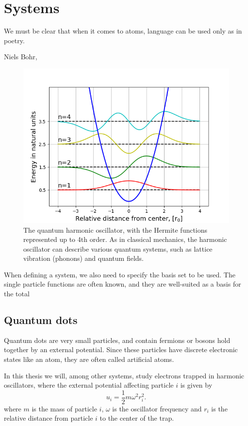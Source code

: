 \chapter{Systems} \label{chp:systems}
\epigraph{We must be clear that when it comes to atoms, language can be used only as in poetry.}{Niels Bohr, \cite{heisenberg_physics_1971}}
\begin{figure}[H]
	\centering
	\includegraphics[scale=0.9]{Images/harmonicOscillator.png}
	\caption{The quantum harmonic oscillator, with the Hermite functions represented up to 4th order. As in classical mechanics, the harmonic oscillator can describe various quantum systems, such as lattice vibration (phonons) and quantum fields.}
	\label{fig:harmonicoscillator}
\end{figure}

When defining a system, we also need to specify the basis set to be used. The single particle functions are often known, and they are well-suited as a basis for the total

\newpage
\section{Quantum dots} \label{subsubsec:quantumdots}
Quantum dots are very small particles, and contain fermions or bosons hold together by an external potential. Since these particles have discrete electronic states like an atom, they are often called artificial atoms. 

In this thesis we will, among other systems, study electrons trapped in harmonic oscillators, where the external potential affecting particle $i$ is given by
\begin{equation}
u_i=\frac{1}{2}m\omega^2r_i^2.
\end{equation}
where $m$ is the mass of particle $i$, $\omega$ is the oscillator frequency and $r_i$ is the relative distance from particle $i$ to the center of the trap. 

